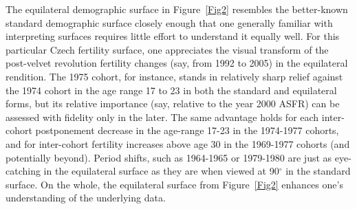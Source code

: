\documentclass[a4paper]{article}
\begin{document}
The equilateral demographic surface in Figure~\ref{Fig2} resembles the better-known standard demographic surface closely enough that one generally familiar with interpreting surfaces requires little effort to understand it equally well. For this particular Czech fertility surface, one appreciates the visual transform of the post-velvet revolution fertility changes (say, from 1992 to 2005) in the equilateral rendition. The 1975 cohort, for instance, stands  in relatively sharp relief against the 1974 cohort in the age range 17 to 23 in both the standard and equilateral forms, but its relative importance (say, relative to the year 2000 ASFR) can be assessed with fidelity only in the later. The same advantage holds for each inter-cohort postponement decrease in the age-range 17-23 in the 1974-1977 cohorts, and for inter-cohort fertility increases above age 30 in the 1969-1977 cohorts (and potentially beyond). Period shifts, such as 1964-1965 or 1979-1980 are just as eye-catching in the equilateral surface as they are when viewed at 90$^\circ$ in the standard surface. On the whole, the equilateral surface from Figure~\ref{Fig2} enhances one's understanding of the underlying data.
\end{document}
